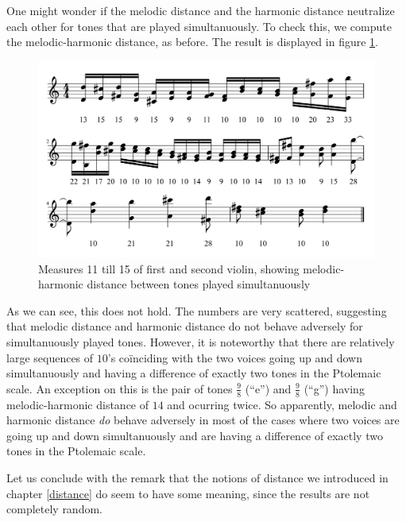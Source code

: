\documentclass[a4paper]{book}
\theoremstyle{definition}
\begin{document}
One might wonder if the melodic distance and the harmonic distance neutralize each other for tones that are played simultanuously.
To check this, we compute the melodic-harmonic distance, as before.
The result is displayed in figure \ref{fig_first_second_violin_melodic_harmonic_distance_self}.

\begin{figure}[H]
    \centering
    \includegraphics[scale=0.25]{figures/fig_first_second_violin_melodic_harmonic_distance_self.png}
    \caption{Measures 11 till 15 of first and second violin, showing melodic-harmonic distance between tones played simultanuously}
    \label{fig_first_second_violin_melodic_harmonic_distance_self}
\end{figure}

As we can see, this does not hold.
The numbers are very scattered, suggesting that melodic distance and harmonic distance do not behave adversely for simultanuously played tones.
However, it is noteworthy that there are relatively large sequences of $10$'s co\"inciding with the two voices going up and down simultanuously and having a difference of exactly two tones in the Ptolemaic scale.
An exception on this is the pair of tones $\frac{9}{8}$ (``e'') and $\frac{9}{8}$ (``g'') having melodic-harmonic distance of $14$ and ocurring twice.
So apparently, melodic and harmonic distance \emph{do} behave adversely in most of the cases where two voices are going up and down simultanuously and are having a difference of exactly two tones in the Ptolemaic scale.


Let us conclude with the remark that the notions of distance we introduced in chapter \ref{distance} do seem to have some meaning, since the results are not completely random.
\end{document}
